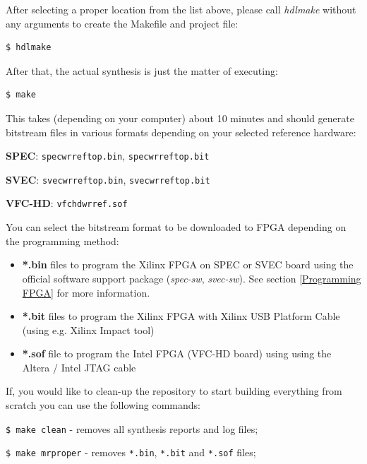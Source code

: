 \documentclass[a4paper, 12pt]{article}
\renewcommand{\_}{\underscore\allowbreak}
\begin{document}
After selecting a proper location from the list above, please call
\textit{hdlmake} without any arguments to create the Makefile and project file:
\begin{lstlisting}
$ hdlmake
\end{lstlisting}

After that, the actual synthesis is just the matter of executing:
\begin{lstlisting}
$ make
\end{lstlisting}

This takes (depending on your computer) about 10 minutes and should generate
bitstream files in various formats depending on your selected reference
hardware:
\begin{itemize*}
  \item \textbf{SPEC}: \texttt{spec\_wr\_ref\_top.bin}, \texttt{spec\_wr\_ref\_top.bit}
  \item \textbf{SVEC}: \texttt{svec\_wr\_ref\_top.bin}, \texttt{svec\_wr\_ref\_top.bit}
  \item \textbf{VFC-HD}: \texttt{vfchd\_wr\_ref.sof}
\end{itemize*}

You can select the bitstream format to be downloaded to FPGA depending on the
programming method:
\begin{itemize}
  \item \textbf{*.bin} files to program the Xilinx FPGA on SPEC or SVEC board
    using the official software support package (\textit{spec-sw},
    \textit{svec-sw}). See section \ref{Programming FPGA} for more
    information.
  \item \textbf{*.bit} files to program the Xilinx FPGA with Xilinx USB Platform
    Cable (using e.g. Xilinx Impact tool)
  \item \textbf{*.sof} file to program the Intel FPGA (VFC-HD board) using using
    the Altera / Intel JTAG cable
\end{itemize}

If, you would like to clean-up the repository to start building everything from
scratch you can use the following commands:
\begin{itemize*}
\item \texttt{\$ make clean} - removes all synthesis reports and log files;
\item \texttt{\$ make mrproper} - removes \texttt{*.bin}, \texttt{*.bit} and
  \texttt{*.sof} files;
\end{itemize*}
\end{document}
